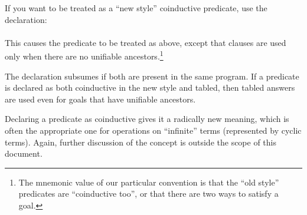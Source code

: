 If you want  to be treated as a ``new style'' coinductive predicate,
use the declaration:\\
\ind{}%
\label{dir:coinductive}\\
This causes the predicate to be treated as above, except that clauses are used
only when there are no unifiable ancestors.\footnote{%
  The mnemonic value of our particular convention is that the ``old style''
  predicates are ``coinductive too'', or that there are two ways to satisfy a
  goal.}

The declaration  subsumes 
if both are present in the same program.  If a predicate is declared as both
coinductive in the new style and tabled, then tabled answers are used even for
goals that have unifiable ancestors.

Declaring a predicate as coinductive gives it a radically new meaning, which is
often the appropriate one for operations on ``infinite'' terms (represented by
cyclic terms).  Again, further discussion of the concept is outside the scope of
this document.
